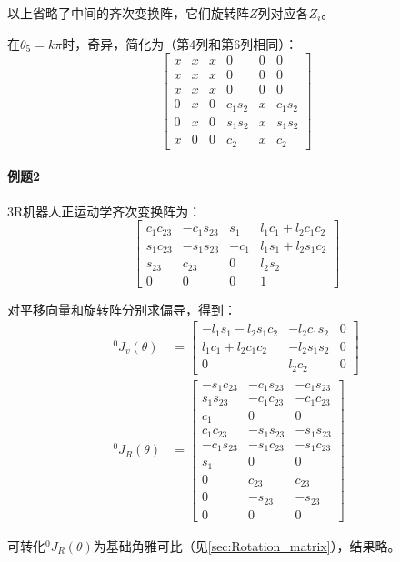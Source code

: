 \documentclass[
12pt, %
a4paper, 
oneside, %
headinclude,footinclude, %
]{scrartcl}
\begin{document}
{以上省略了中间的齐次变换阵，它们旋转阵$ Z $列对应各$ Z_i $。

在$ \theta_5 = k\pi $时，奇异，简化为（第4列和第6列相同）：
$$ \begin{bmatrix} x & x & x& 0 & 0 & 0 \\ x & x & x & 0 & 0 & 0 \\ x & x & x& 0 & 0 & 0 \\ 0 & x & 0 & c_1 s_2 & x & c_1 s_2 \\ 0 & x & 0 & s_1 s_2 & x & s_1 s_2 \\ x & 0 & 0 & c_2 & x& c_2 \end{bmatrix} $$
}
\paragraph{例题2}\label{sec:example4.2}
{\footnotesize
3R机器人正运动学齐次变换阵为：
$$ \begin{bmatrix} c_1c_{23} & -c_1s_{23} & s_1 & l_1c_1 + l_2c_1c_2 \\ s_1c_{23} & -s_1s_{23} & -c_1 & l_1s_1 + l_2s_1c_2 \\ s_{23} & c_{23} & 0 & l_2s_2 \\ 0 & 0 & 0 & 1 \end{bmatrix} $$

对平移向量和旋转阵分别求偏导，得到：
\begin{align*}
^0J_v(\theta) &= \begin{bmatrix} -l_1s_1 - l_2s_1c_2 & -l_2c_1s_2 & 0 \\ l_1c_1 + l_2c_1c_2 & -l_2s_1s_2 & 0 \\ 0 & l_2c_2 & 0 \end{bmatrix} \\
^0J_R(\theta) &= \begin{bmatrix} -s_1c_{23} & -c_1s_{23} & -c_1s_{23} \\ s_1s_{23} & -c_1c_{23} & -c_1c_{23} \\ c_1 & 0 & 0 \\ c_1c_{23} & -s_1s_{23} & -s_1s_{23} \\ -c_1s_{23} & -s_1c_{23} & -s_1c_{23} \\ s_1 & 0 & 0 \\ 0 & c_{23} & c_{23} \\ 0 & -s_{23} & -s_{23} \\ 0 & 0 & 0 \end{bmatrix}
\end{align*}

可转化$ ^0J_R(\theta) $为基础角雅可比（见\ref{sec:Rotation_matrix}），结果略。
}
\end{document}
